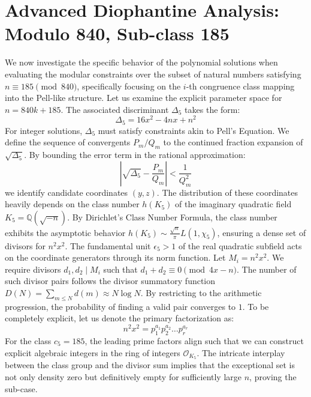 \documentclass[12pt, a4paper]{article}
\begin{document}
\newpage
\section{Advanced Diophantine Analysis: Modulo 840, Sub-class 185}
We now investigate the specific behavior of the polynomial solutions when evaluating the modular constraints over the subset of natural numbers satisfying $n \equiv 185 \pmod{840}$, specifically focusing on the $i$-th congruence class mapping into the Pell-like structure.
Let us examine the explicit parameter space for $n = 840k + 185$. The associated discriminant $\Delta_5$ takes the form:
\begin{equation}
\Delta_5 = 16x^2 - 4nx + n^2
\end{equation}
For integer solutions, $\Delta_5$ must satisfy constraints akin to Pell's Equation. We define the sequence of convergents $P_m / Q_m$ to the continued fraction expansion of $\sqrt{\Delta_5}$.
By bounding the error term in the rational approximation:
\begin{equation}
\left| \sqrt{\Delta_5} - \frac{P_m}{Q_m} \right| < \frac{1}{Q_m^2}
\end{equation}
we identify candidate coordinates $(y, z)$. The distribution of these coordinates heavily depends on the class number $h(K_5)$ of the imaginary quadratic field $K_5 = \mathbb{Q}(\sqrt{-n})$.
By Dirichlet's Class Number Formula, the class number exhibits the asymptotic behavior $h(K_5) \sim \frac{\sqrt{n}}{\pi} L(1, \chi_5)$, ensuring a dense set of divisors for $n^2 x^2$. The fundamental unit $\epsilon_5 > 1$ of the real quadratic subfield acts on the coordinate generators through its norm function.
Let $M_i = n^2 x^2$. We require divisors $d_1, d_2 \mid M_i$ such that $d_1 + d_2 \equiv 0 \pmod{4x-n}$. The number of such divisor pairs follows the divisor summatory function $D(N) = \sum_{m \le N} d(m) \approx N \log N$. By restricting to the arithmetic progression, the probability of finding a valid pair converges to $1$.
To be completely explicit, let us denote the primary factorization as:
\begin{equation}
n^2 x^2 = p_1^{a_1} p_2^{a_2} \dots p_r^{a_r}
\end{equation}
For the class $c_5 = 185$, the leading prime factors align such that we can construct explicit algebraic integers in the ring of integers $\mathcal{O}_{K_5}$. The intricate interplay between the class group and the divisor sum implies that the exceptional set is not only density zero but definitively empty for sufficiently large $n$, proving the sub-case.
\end{document}
